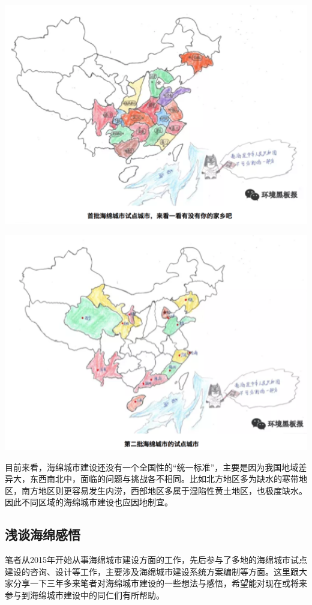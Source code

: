 \documentclass[]{book}
\begin{document}
\includegraphics[width=6.67in]{images/ch5}

\includegraphics[width=6.67in]{images/ch6}

目前来看，海绵城市建设还没有一个全国性的``统一标准''，主要是因为我国地域差异大，东西南北中，面临的问题与挑战各不相同。比如北方地区多为缺水的寒带地区，南方地区则更容易发生内涝，西部地区多属于湿陷性黄土地区，也极度缺水。因此不同区域的海绵城市建设也应因地制宜。

\subsection{浅谈海绵感悟}

笔者从2015年开始从事海绵城市建设方面的工作，先后参与了多地的海绵城市试点建设的咨询、设计等工作，主要涉及海绵城市建设系统方案编制等方面。这里跟大家分享一下三年多来笔者对海绵城市建设的一些想法与感悟，希望能对现在或将来参与到海绵城市建设中的同仁们有所帮助。
\end{document}
